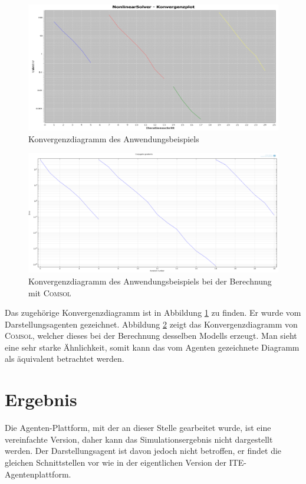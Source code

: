 \documentclass[a4paper,12pt,oneside,openright,onecolumn,final,titlepage,fleqn,ngerman]{scrreprt}
\newcommand{\repag}{Darstellungsagent}
\begin{document}
	\begin{figure}[ht]
		\includegraphics[keepaspectratio=true,width=\textwidth]{res/bsp_konvplot.png}
		\caption{Konvergenzdiagramm des Anwendungsbeispiels}
		\label{fig_bsp_konvplot}
	\end{figure}
	\begin{figure}[ht]
		\includegraphics[keepaspectratio=true,width=\textwidth]{res/bsp_konvplot_comsol.png}
		\caption[Konvergenzdiagramm des Anwendungsbeispiels (\textsc{Comsol})]{Konvergenzdiagramm des Anwendungsbeispiels bei der Berechnung mit \textsc{Comsol}}
		\label{fig_bsp_konvplot_comsol}
	\end{figure}
	Das zugehörige Konvergenzdiagramm ist in Abbildung \ref{fig_bsp_konvplot} zu finden. Er wurde vom \repag{}en gezeichnet. Abbildung \ref{fig_bsp_konvplot_comsol} zeigt das Konvergenzdiagramm von \textsc{Comsol}, welcher dieses bei der Berechnung desselben Modells erzeugt. Man sieht eine sehr starke Ähnlichkeit, somit kann das vom Agenten gezeichnete Diagramm als äquivalent betrachtet werden.
	
	\section{Ergebnis}
	Die Agenten-Plattform, mit der an dieser Stelle gearbeitet wurde, ist eine vereinfachte Version, daher kann das Simulationsergebnis nicht dargestellt werden. Der \repag{} ist davon jedoch nicht betroffen, er findet die gleichen Schnittstellen vor wie in der eigentlichen Version der ITE-Agentenplattform.
\end{document}
